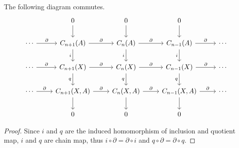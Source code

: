 \begin{prop} The following diagram commutes.
\begin{equation}
\begin{tikzcd}
&0\arrow{d}&0\arrow{d}&0\arrow{d}&\\
\cdots\arrow{r}{\partial}&C_{n+1}(A)\arrow{r}{\partial}\arrow[swap]{d}{i}&C_{n}(A)\arrow{r}{\partial}\arrow[swap]{d}{i}&C_{n-1}(A)\arrow{r}{\partial}\arrow[swap]{d}{i}&\cdots\\
\cdots\arrow{r}{\partial}&C_{n+1}(X)\arrow{r}{\partial}\arrow[swap]{d}{q}&C_{n}(X)\arrow{r}{\partial}\arrow[swap]{d}{q}&C_{n-1}(X)\arrow{r}{\partial}\arrow[swap]{d}{q}&\cdots\\
\cdots\arrow{r}{\partial}&C_{n+1}(X,A)\arrow{r}{\partial}\arrow[swap]{d}&C_{n}(X,A)\arrow{r}{\partial}\arrow[swap]{d}&C_{n-1}(X,A)\arrow{r}{\partial}\arrow[swap]{d}&\cdots\\
&0&0&0&
\end{tikzcd}
\end{equation}
\end{prop}
\begin{proof}
Since $i$ and $q$ are the induced homomorphism of inclusion and quotient map, $i$ and $q$ are chain map, thus $i\circ \partial=\partial\circ i$ and $q\circ \partial=\partial\circ q$.
\end{proof}

